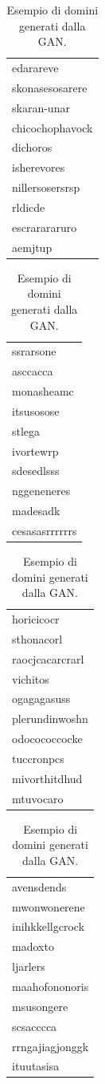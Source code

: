 \begin{table}[!bp]
\centering
	\begin{tabular}{l}
	\toprule
edarareve \\
skonasesosarere \\
skaran-unar \\
chicochophavock \\
dichoros \\
isherevores \\
nillersosersrsp \\
rldicde \\
escrarararuro \\
aemjtup \\
	\bottomrule
	\end{tabular}
	\begin{tabular}{l}
	\toprule
	ssrarsone \\
asccacca \\
monasheamc \\
itsusosose \\
stlega \\
ivortewrp \\
sdesedlsss \\
nggeneneres \\
madesadk \\
cesasasrrrrrrs \\
	\bottomrule
	\end{tabular}
	\begin{tabular}{l}
	\toprule
	horicicocr \\
sthonacorl \\
raocjcacarcrarl \\
vichitos \\
ogagagasuss \\
plerundinwoshn \\
odocococcocke \\
tuccronpcs \\
mivorthitdhud \\
mtuvocaro \\
	\bottomrule
	\end{tabular}
	\begin{tabular}{l}
	\toprule
avensdends \\
mwonwonerene \\
inihkkellgcrock \\
madoxto \\
ljarlers \\
maahofononoris \\
msusongere \\
scsacccca \\
rrngajiagjonggk \\
ituutasisa \\
	\bottomrule
	\end{tabular}

\caption{Esempio di domini generati dalla GAN. \label{tab:gan}}
\end{table}

